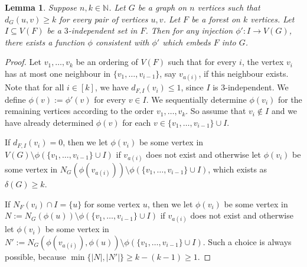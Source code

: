 \documentclass[a4paper, 11pt, reqno]{amsart}
\newtheorem{lemma}[definition]{Lemma}
\numberwithin{equation}{section}
\newcommand{\1}{{\rm 1\hspace*{-0.4ex}%
\rule{0.1ex}{1.52ex}\hspace*{0.2ex}}}
\newcommand{\N}{\mathbb N}
\begin{document}
\begin{lemma}\label{lem: embed forests}
Suppose $n,k\in\N$.
Let $G$ be a graph on $n$ vertices 
such that $d_G(u,v) \geq k$ for every pair of vertices $u, v$.
Let $F$ be a forest on $k$ vertices. 
Let $I\subseteq V(F)$ be a $3$-independent set in $F$.
Then for any injection $\phi':I\to V(G)$, there exists a function $\phi$ consistent with $\phi'$ which embeds $F$ into $G$.
\end{lemma}
\begin{proof}
Let $v_1,\dots, v_k$ be an ordering of $V(F)$ 
such that for every $i$, the vertex $v_i$ has at most one neighbour in $\{v_1,\dots, v_{i-1}\}$,
say $v_{a(i)}$, if this neighbour exists. 
Note that for all $i\in [k]$, we have $d_{F,I}(v_i)\leq 1$, since $I$ is $3$-independent.
 We define $\phi(v):=\phi'(v)$ for every $v\in I$.  
We sequentially determine $\phi(v_i)$ for the remaining vertices according to the order $v_1,\dots, v_k$.
So assume that $v_i\notin I$ and we have already determined $\phi(v)$ for each $v\in \{v_1,\ldots,v_{i-1}\}\cup I$.


If $d_{F,I}(v_i)=0$, 
then we let $\phi(v_i)$ be some vertex in $V(G)\setminus \phi(\{v_1,\dots, v_{i-1}\}\cup I)$
if $v_{a(i)}$ does not exist and otherwise let $\phi(v_i)$ be some vertex in
$N_{G}(\phi(v_{a(i)}))\setminus \phi(\{v_1,\dots, v_{i-1}\}\cup I)$,
which exists as $\delta(G)\geq k$.

If $N_{F}(v_i)\cap I = \{u\}$ for some vertex $u$, 
then we let $\phi(v_i)$ be some vertex in $N:=N_{G}(\phi(u)) \setminus \phi(\{v_1,\dots, v_{i-1}\}\cup I)$ if $v_{a(i)}$ does not exist and otherwise let $\phi(v_i)$ be some vertex in $N':=N_{G}(\phi(v_{a(i)}),\phi(u)) \setminus \phi(\{v_1,\dots, v_{i-1}\}\cup I)$. 
Such a choice is always possible, because $\min\{ |N|, |N'|\} \geq k - (k-1) \geq 1$.
\end{proof}
\end{document}
